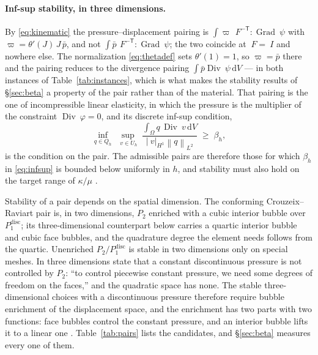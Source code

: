 \documentclass[11pt]{article}
\newcommand{\F}{~F}
\newcommand{\Id}{~I}
\newcommand{\disp}{~\varphi}
\newcommand{\testd}{~\psi}
\newcommand{\Grad}{\operatorname{Grad}}
\newcommand{\Div}{\operatorname{Div}}
\newcommand{\norm}[1]{\left\lVert #1 \right\rVert}
\newcommand{\diff}{\,\mathrm{d}}
\theoremstyle{definition}
\theoremstyle{plain}
\begin{document}
\paragraph{Inf-sup stability, in three dimensions.} By \eqref{eq:kinematic} the
pressure--displacement pairing is
$\int \varpi \,\F^{-\mathsf T}\!:\!\Grad\testd$ with
$\varpi = \theta'(J)\,J\,\bar p$, and not $\int \bar p
\,\F^{-\mathsf T}\!:\!\Grad\testd$; the two coincide at $\F = \Id$ and nowhere
else. The normalization \eqref{eq:thetadef} sets $\theta'(1) = 1$, so
$\varpi = \bar p$ there and the pairing reduces to the divergence pairing
$\int \bar p \Div\testd \diff V$ --- in both instances of
Table~\ref{tab:instances}, which is what makes the stability results of
\S\ref{sec:beta} a property of the pair rather than of the material. That
pairing is the one of incompressible linear elasticity, in which the pressure
is the multiplier of the constraint $\Div\disp = 0$, and its discrete
inf-sup condition,
\begin{equation}
  \label{eq:infsup}
  \inf_{q \in Q_h}\;\sup_{~v \in U_h}\;
  \frac{\int_\Omega q \, \Div ~v \diff V}{\lvert ~v \rvert_{H^1} \norm{q}_{L^2}}
  \;\ge\; \beta_h ,
\end{equation}
is the condition on the pair. The admissible pairs are therefore those for
which $\beta_h$ in \eqref{eq:infsup} is bounded below uniformly in $h$, and
stability must also hold on the target range of $\kappa/\mu$
\citep{BoffiBrezziFortin:2013}.

Stability of a pair depends on the spatial dimension. The conforming Crouzeix--Raviart pair \citep{CrouzeixRaviart:1973} is, in two
dimensions, $P_2$ enriched with a cubic interior bubble over
$P_1^{\mathrm{disc}}$; its three-dimensional counterpart below carries a
quartic interior bubble and cubic face bubbles, and the quadrature degree the
element needs follows from the quartic. Unenriched
$P_2/P_1^{\mathrm{disc}}$ is stable in two dimensions only on special meshes.
In three dimensions \citet[\S8.7]{BoffiBrezziFortin:2013} state that a
constant discontinuous pressure is not controlled by $P_2$: ``to control
piecewise constant pressure, we need some degrees of freedom on the faces,''
and the quadratic space has none. The stable three-dimensional choices with a
discontinuous pressure therefore require bubble enrichment of the displacement
space, and the enrichment has two parts with two functions: face bubbles control the
constant pressure, and an interior bubble lifts it to a linear one
\citep[Example~8.7.2]{BoffiBrezziFortin:2013}. Table~\ref{tab:pairs} lists the
candidates, and \S\ref{sec:beta} measures every one of them.
\end{document}

